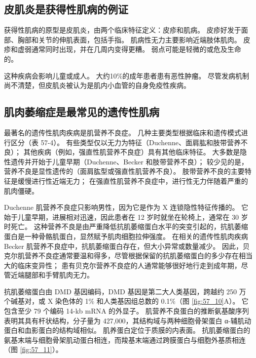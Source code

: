 \subsection{皮肌炎是获得性肌病的例证}

获得性肌病的原型是皮肌炎，由两个临床特征定义：皮疹和肌病。
皮疹好发于面部、胸部和关节的伸肌表面，包括手指。
肌病性无力主要影响近端肢体肌肉。
皮疹和虚弱通常同时出现，并在几周内变得更糟。
弱点可能是轻微的或危及生命的。


这种疾病会影响儿童或成人。
大约10\%的成年患者患有恶性肿瘤。
尽管发病机制尚不清楚，但皮肌炎被认为是肌内小血管的自身免疫性疾病。



\subsection{肌肉萎缩症是最常见的遗传性肌病}

最著名的遗传性肌肉疾病是肌营养不良症。
几种主要类型根据临床和遗传模式进行区分（表 57-4）。
有些类型仅以无力为特征（Duchenne、面肩肱和肢带营养不良）；
其他疾病（例如，强直性肌营养不良症）具有其他临床特征。 大多数是隐性遗传并开始于儿童早期（Duchenne、Becker 和肢带营养不良）；
较少见的是，营养不良是显性遗传的（面肩肱型或强直性肌营养不良）。
肢带营养不良的主要特征是缓慢进行性近端无力；
在强直性肌营养不良症中，进行性无力伴随着严重的肌肉僵硬。


Duchenne 肌营养不良症只影响男性，因为它是作为 X 连锁隐性特征传播的。
它始于儿童早期，进展相对迅速，因此患者在 12 岁时就坐在轮椅上，通常在 30 岁时死亡。
这种营养不良是由严重降低抗肌萎缩蛋白水平的突变引起的，抗肌萎缩蛋白是一种骨骼肌蛋白，显然赋予肌肉细胞拉伸强度。
在相关的遗传性肌肉疾病 Becker 肌营养不良症中，抗肌萎缩蛋白存在，但大小异常或数量减少。
因此，贝克尔肌营养不良症通常要温和得多，尽管根据保留的抗肌萎缩蛋白的多少存在相当大的临床变异性；
患有贝克尔营养不良症的人通常能够很好地行走到成年期，尽管近端腿部和手臂肌肉无力。


抗肌萎缩蛋白由 DMD 基因编码，DMD 基因是第二大人类基因，跨越约 250 万个碱基对，或 X 染色体的 1\% 和人类基因组总数的 0.1\%（图 \ref{fig:57_10}A）。
它包含至少 79 个编码 14-kb mRNA 的外显子。
肌营养不良蛋白的推断氨基酸序列表明其具有杆状结构，分子量为 427,000，其结构域与两种细胞骨架蛋白 α-辅肌动蛋白和血影蛋白的结构域相似。
肌养蛋白定位于质膜的内表面。
抗肌萎缩蛋白的氨基末端与细胞骨架肌动蛋白相连，而羧基末端通过跨膜蛋白与细胞外基质相连（图 \ref{fig:57_11}）。


